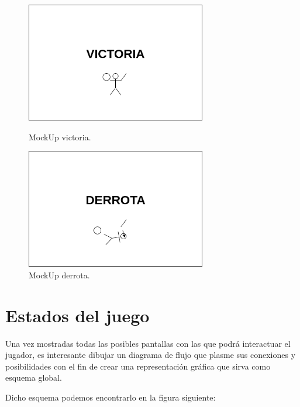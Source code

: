 \begin{figure}[ht]
\centering
\begin{minipage}[c]{0.45\linewidth}
	\hspace{9mm}
	\includegraphics[width=0.7\textwidth]{imagenes/gdd/pantallas/Pantalla_victoria.png}
	\caption{MockUp victoria.}
	\label{mockup_victoria}
\end{minipage}
\begin{minipage}[c]{0.45\linewidth}
	\hspace{9mm}
	\includegraphics[width=0.7\textwidth]{imagenes/gdd/pantallas/Pantalla_derrota.png}
	\caption{MockUp derrota.}
	\label{mockup_derrota}
\end{minipage}	
\end{figure}

\section{Estados del juego}
Una vez mostradas todas las posibles pantallas con las que podrá interactuar el jugador,
es interesante dibujar un diagrama de flujo que plasme sus conexiones y posibilidades
con el fin de crear una representación gráfica que sirva como esquema global.

Dicho esquema podemos encontrarlo en la figura siguiente:

